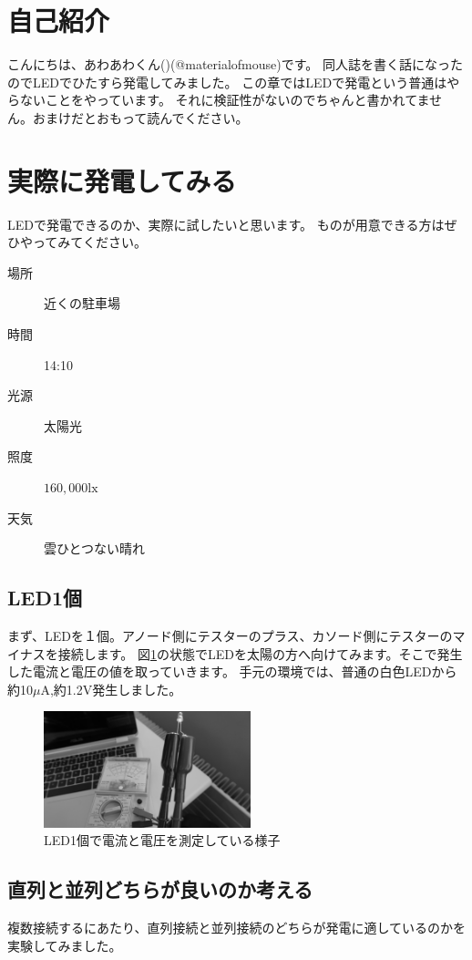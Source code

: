 \section{自己紹介}
こんにちは、あわあわくん()(@materialofmouse)です。
同人誌を書く話になったのでLEDでひたすら発電してみました。
この章ではLEDで発電という普通はやらないことをやっています。
それに検証性がないのでちゃんと書かれてません。おまけだとおもって読んでください。

\section{実際に発電してみる}
LEDで発電できるのか、実際に試したいと思います。
ものが用意できる方はぜひやってみてください。

\begin{description}
  \item[場所]{近くの駐車場}
  \item[時間]{14:10}
  \item[光源]{太陽光}
  \item[照度]{$160,000\si\lux$}
  \item[天気]{雲ひとつない晴れ}
\end{description}


\subsection{LED1個}
まず、LEDを１個。アノード側にテスターのプラス、カソード側にテスターのマイナスを接続します。
図\ref{fig:led1}の状態でLEDを太陽の方へ向けてみます。そこで発生した電流と電圧の値を取っていきます。
手元の環境では、普通の白色LEDから約10$\mu\si\ampere$,約1.2$\si\volt$発生しました。

\begin{figure}[htbp]
    \centering
    \includegraphics[width=60mm]{./assets/mouse/gray/1.JPG}
    \caption{LED1個で電流と電圧を測定している様子}
    \label{fig:led1}
\end{figure}

\subsection{直列と並列どちらが良いのか考える}
複数接続するにあたり、直列接続と並列接続のどちらが発電に適しているのかを実験してみました。

